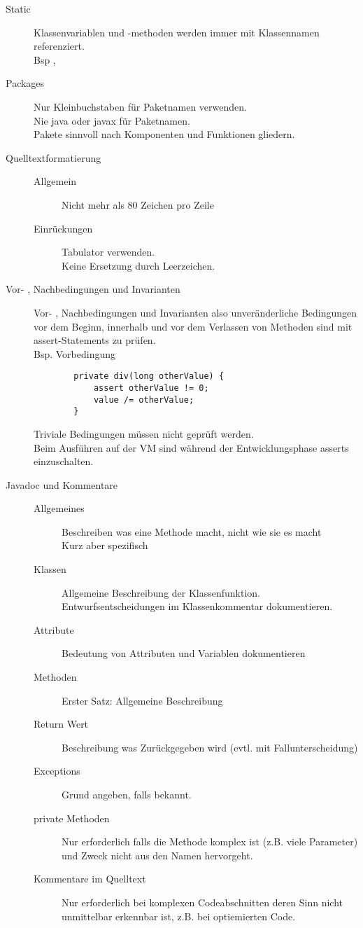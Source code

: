 \begin{description}
\item [Static]
	Klassenvariablen und -methoden werden immer mit Klassennamen referenziert. \\ 
	Bsp , 
\item [Packages]
    Nur Kleinbuchstaben für Paketnamen verwenden. \\
    Nie java oder javax für Paketnamen. \\
	Pakete sinnvoll nach Komponenten und Funktionen gliedern.
\item [Quelltextformatierung]
\begin{description}
	\item [Allgemein]
		Nicht mehr als 80 Zeichen pro Zeile
	\item [Einrückungen]
		Tabulator verwenden. \\
		Keine Ersetzung durch Leerzeichen.
\end{description}
\item [Vor- , Nachbedingungen und Invarianten]
	Vor- , Nachbedingungen und Invarianten also unveränderliche Bedingungen vor dem Beginn,
	innerhalb und vor dem Verlassen von Methoden sind mit assert-Statements zu prüfen. \\
	Bsp. Vorbedingung
	\begin{lstlisting}
		private div(long otherValue) {
			assert otherValue != 0;
			value /= otherValue;
		}
	\end{lstlisting}
	Triviale Bedingungen müssen nicht geprüft werden. \\
	Beim Ausführen auf der VM sind während der Entwicklungsphase asserts einzuschalten.

\item [Javadoc und Kommentare]

\begin{description}
	\item [Allgemeines]
	    Beschreiben was eine Methode macht, nicht wie sie es macht\\
	    Kurz aber spezifisch
	\item [Klassen]
		Allgemeine Beschreibung der Klassenfunktion.\\
	    Entwurfsentscheidungen im Klassenkommentar dokumentieren.
	\item [Attribute]
    	Bedeutung von Attributen und Variablen dokumentieren 
	\item [Methoden]
		Erster Satz: Allgemeine Beschreibung \\
	\item [Return Wert]
		Beschreibung was Zurückgegeben wird (evtl. mit Fallunterscheidung)
	\item [Exceptions]
		Grund angeben, falls bekannt.
	\item [private Methoden]
		Nur erforderlich falls die Methode komplex ist (z.B. viele Parameter)
		und Zweck nicht aus den Namen hervorgeht.
	\item [Kommentare im Quelltext]
		Nur erforderlich bei komplexen Codeabschnitten deren Sinn nicht
		unmittelbar erkennbar ist, z.B. bei optiemierten Code.
\end{description}
\end{description}
  	  	 

